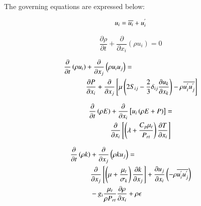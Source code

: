 \documentclass[preprint,12pt]{elsarticle}
\begin{document}
The governing equations are expressed below:

\begin{equation}
\centering
u_i = \overline{u_i} + u^{'}_{i}
\label{eq:veldecomp}
\end{equation}

\begin{equation}
\frac{\partial \rho }{\partial t } + \frac{\partial }{\partial x_i} \left( \rho u_i \right) = 0 
\label{eq:mass}
\end{equation}

\begin{equation}
\centering
\begin{split}
\frac{\partial }{\partial t} \left( \rho u_i \right) &+ \frac{\partial }{\partial x_j } \left( \rho u_i u_j \right) = \\
 &\frac{\partial P}{\partial x_i } + \frac{\partial }{\partial x_j } \left[ \mu \left( 2 S_{ij} - \frac{2}{3} \delta_{ij} \frac{\partial u_k }{\partial x_k } \right) - \rho \overline{u^{'}_{i} u^{'}_{j}} \right] 
\label{eq:momentum}
\end{split}
\end{equation}

\begin{equation}
\centering
\begin{split}
\frac{\partial }{\partial t } \left( \rho E \right) &+ \frac{\partial }{\partial x_i} \left[ u_i \left( \rho E + P \right) \right] = \\
 &\frac{\partial }{\partial x_i } \left[ \left( \lambda + \frac{C_p \mu_t }{P_{rt}} \right) \frac{\partial T}{\partial x_i} \right] 
\label{eq:energy}
\end{split}
\end{equation}

\begin{equation}
\centering
\begin{split}
\frac{\partial }{\partial t} \left(\rho k \right) &+ \frac{\partial }{\partial x_j} \left( \rho k u_j \right) = \\
&\frac{\partial }{\partial x_j} \left[ \left( \mu + \frac{\mu_t}{\sigma_k} \right) \frac{\partial k}{\partial x_j} \right] + \frac{\partial u_j}{\partial x_i} \left( -\rho \overline{u^{'}_{i} u^{'}_{j}} \right) \\
&- g_i \frac{\mu_t}{\rho P_{rt}} \frac{\partial \rho }{\partial x_i} + \rho \epsilon
\label{eq:k}
\end{split}
\end{equation}
\end{document}

